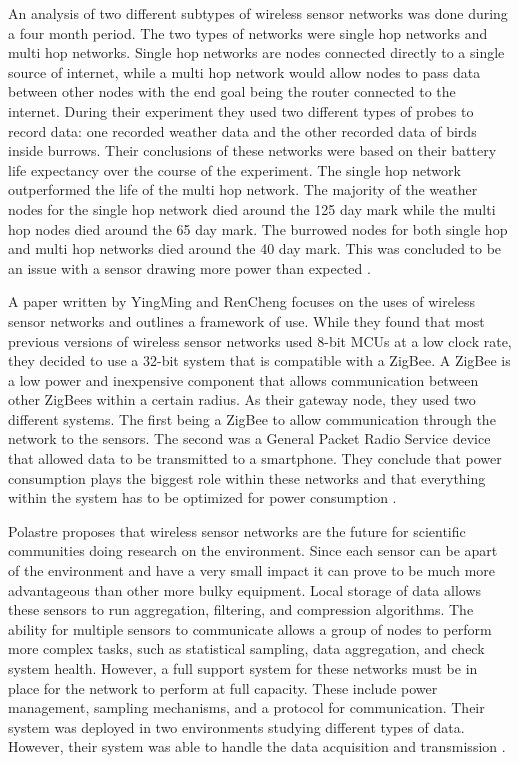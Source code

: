 An analysis of two different subtypes of wireless sensor networks was done during a four month period. The two types of networks were single hop networks and multi hop networks. Single hop networks are nodes connected directly to a single source of internet, while a multi hop network would allow nodes to pass data between other nodes with the end goal being the router connected to the internet. During their experiment they used two different types of probes to record data: one recorded weather data and the other recorded data of birds inside burrows. Their conclusions of these networks were based on their battery life expectancy over the course of the experiment. The single hop network outperformed the life of the multi hop network. The majority of the weather nodes for the single hop network died around the 125 day mark while the multi hop nodes died around the 65 day mark. The burrowed nodes for both single hop and multi hop networks died around the 40 day mark. This was concluded to be an issue with a sensor drawing more power than expected \cite{szewczyk_analysis_2004}.


A paper written by YingMing and RenCheng focuses on the uses of wireless sensor networks and outlines a framework of use. While they found that most previous versions of wireless sensor networks used 8-bit MCUs at a low clock rate, they decided to use a 32-bit system that is compatible with a ZigBee. A ZigBee is a low power and inexpensive component that allows communication between other ZigBees within a certain radius. As their gateway node, they used two different systems. The first being a ZigBee to allow communication through the network to the sensors. The second was a General Packet Radio Service device that allowed data to be transmitted to a smartphone. They conclude that power consumption plays the biggest role within these networks and that everything within the system has to be optimized for power consumption \cite{yingming_novel_2008}.


Polastre proposes that wireless sensor networks are the future for scientific communities doing research on the environment. Since each sensor can be apart of the environment and have a very small impact it can prove to be much more advantageous than other more bulky equipment. Local storage of data allows these sensors to run aggregation, filtering, and compression algorithms. The ability for multiple sensors to communicate allows a group of nodes to perform more complex tasks, such as statistical sampling, data aggregation, and check system health. However, a full support system for these networks must be in place for the network to perform at full capacity. These include power management, sampling mechanisms, and a protocol for communication. Their system was deployed in two environments studying different  types of data. However, their system was able to handle the data acquisition and transmission \cite{polastre_design_2003}.
